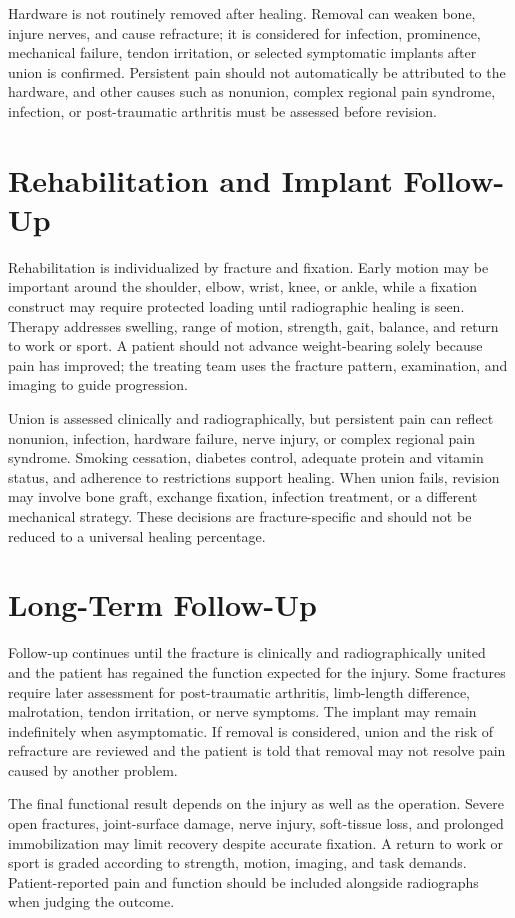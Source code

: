 Hardware is not routinely removed after healing. Removal can weaken bone, injure nerves, and cause refracture; it is considered for infection, prominence, mechanical failure, tendon irritation, or selected symptomatic implants after union is confirmed. Persistent pain should not automatically be attributed to the hardware, and other causes such as nonunion, complex regional pain syndrome, infection, or post-traumatic arthritis must be assessed before revision.

\section*{Rehabilitation and Implant Follow-Up}
Rehabilitation is individualized by fracture and fixation. Early motion may be important around the shoulder, elbow, wrist, knee, or ankle, while a fixation construct may require protected loading until radiographic healing is seen. Therapy addresses swelling, range of motion, strength, gait, balance, and return to work or sport. A patient should not advance weight-bearing solely because pain has improved; the treating team uses the fracture pattern, examination, and imaging to guide progression.

Union is assessed clinically and radiographically, but persistent pain can reflect nonunion, infection, hardware failure, nerve injury, or complex regional pain syndrome. Smoking cessation, diabetes control, adequate protein and vitamin status, and adherence to restrictions support healing. When union fails, revision may involve bone graft, exchange fixation, infection treatment, or a different mechanical strategy. These decisions are fracture-specific and should not be reduced to a universal healing percentage.

\section*{Long-Term Follow-Up}
Follow-up continues until the fracture is clinically and radiographically united and the patient has regained the function expected for the injury. Some fractures require later assessment for post-traumatic arthritis, limb-length difference, malrotation, tendon irritation, or nerve symptoms. The implant may remain indefinitely when asymptomatic. If removal is considered, union and the risk of refracture are reviewed and the patient is told that removal may not resolve pain caused by another problem.

The final functional result depends on the injury as well as the operation. Severe open fractures, joint-surface damage, nerve injury, soft-tissue loss, and prolonged immobilization may limit recovery despite accurate fixation. A return to work or sport is graded according to strength, motion, imaging, and task demands. Patient-reported pain and function should be included alongside radiographs when judging the outcome.

